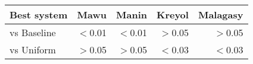 \begin{tabular}{lrrrr}
\toprule
Best system & Mawu & Manin & Kreyol & Malagasy \\
\toprule
vs Baseline & $<$0.01 & $<$0.01 & $>$0.05 & $>$0.05 \\
vs Uniform & $>$0.05 & $>$0.05 & $<$0.03 & $<$0.03 \\
\bottomrule
\end{tabular}

